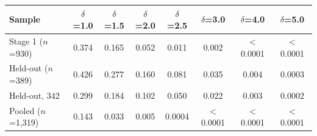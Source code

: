 \begin{tabular}{lccccccc}
\toprule
Sample & $\delta$=1.0 & $\delta$=1.5 & $\delta$=2.0 & $\delta$=2.5 & $\delta$=3.0 & $\delta$=4.0 & $\delta$=5.0 \\
\midrule
Stage 1 ($n$=930) & 0.374 & 0.165 & 0.052 & 0.011 & 0.002 & $<$0.0001 & $<$0.0001 \\
Held-out ($n$=389) & 0.426 & 0.277 & 0.160 & 0.081 & 0.035 & 0.004 & 0.0003 \\
Held-out, 342 & 0.299 & 0.184 & 0.102 & 0.050 & 0.022 & 0.003 & 0.0002 \\
Pooled ($n$=1{,}319) & 0.143 & 0.033 & 0.005 & 0.0004 & $<$0.0001 & $<$0.0001 & $<$0.0001 \\
\bottomrule
\end{tabular}
